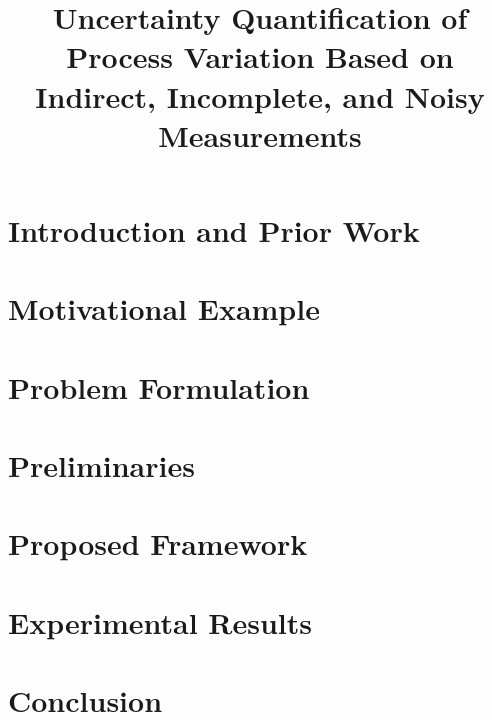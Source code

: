 \documentclass[9pt,conference]{IEEEtran}
\begin{document}
  \title{Uncertainty Quantification of Process Variation Based on Indirect, Incomplete, and Noisy Measurements\vspace{-1em}}

  \author{
  }

  \maketitle

  \begin{abstract}
    
  \end{abstract}

  \section{Introduction and Prior Work} 
  

  \section{Motivational Example} 
  

  \section{Problem Formulation} 
  

  \section{Preliminaries}  
  

  \section{Proposed Framework} 
  

  \section{Experimental Results} 
  

  \section{Conclusion} 
  

  \begingroup
  \setlength\bibitemsep{2pt}
  \printbibliography
  \endgroup
\end{document}
